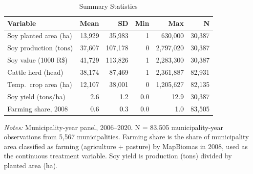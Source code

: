 \begin{table}[H]
\centering
\caption{Summary Statistics}
\begin{threeparttable}
\scriptsize
\begin{tabular}{lrrrrr}
\toprule
Variable & Mean & SD & Min & Max & N \\
\midrule
Soy planted area (ha) & 13,929 & 35,983 & 1 & 630,000 & 30,387 \\
Soy production (tons) & 37,607 & 107,178 & 0 & 2,797,020 & 30,387 \\
Soy value (1000 R\$) & 41,729 & 113,826 & 1 & 2,283,300 & 30,387 \\
Cattle herd (head) & 38,174 & 87,469 & 1 & 2,361,887 & 82,931 \\
Temp.\ crop area (ha) & 12,107 & 38,001 & 0 & 1,205,627 & 82,135 \\
Soy yield (tons/ha) & 2.6 & 1.2 & 0.0 & 12.9 & 30,387 \\
Farming share, 2008 & 0.6 & 0.3 & 0.0 & 1.0 & 83,505 \\
\bottomrule
\end{tabular}
\begin{tablenotes}[flushleft]
\small
\item \textit{Notes:} Municipality-year panel, 2006--2020. N = 83,505 municipality-year observations from 5,567 municipalities. Farming share is the share of municipality area classified as farming (agriculture + pasture) by MapBiomas in 2008, used as the continuous treatment variable. Soy yield is production (tons) divided by planted area (ha).
\end{tablenotes}
\end{threeparttable}
\label{tab:summary}
\end{table}
